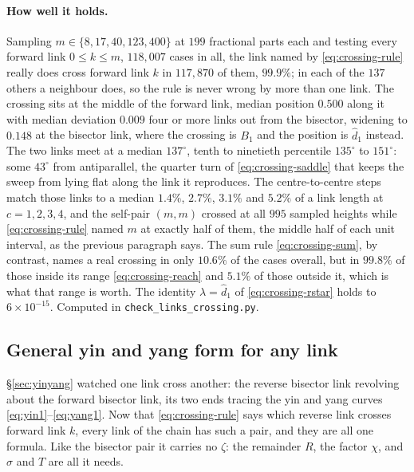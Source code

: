 \documentclass[11pt]{article}
\theoremstyle{definition}
\begin{document}
\paragraph{How well it holds.} Sampling $m\in\{8,17,40,123,400\}$ at $199$
fractional parts each and testing every forward link $0\leq k\leq m$,
$118{,}007$ cases in all, the link named by \eqref{eq:crossing-rule} really does
cross forward link $k$ in $117{,}870$ of them, $99.9\%$; in each of the $137$
others a neighbour does, so the rule is never wrong by more than one link. The
crossing sits at the middle of the forward link, median position $0.500$ along
it with median deviation $0.009$ four or more links out from the bisector, widening
to $0.148$ at the bisector link, where the crossing is $B_1$ and the position is
$\hat d_1$ instead. The two links meet at a median $137^{\circ}$, tenth to
ninetieth percentile $135^{\circ}$ to $151^{\circ}$: some $43^{\circ}$ from
antiparallel, the quarter turn of \eqref{eq:crossing-saddle} that keeps the
sweep from lying flat along the link it reproduces. The centre-to-centre steps
match those links to a median $1.4\%$, $2.7\%$, $3.1\%$ and $5.2\%$ of a link
length at $c=1,2,3,4$, and the self-pair $(m,m)$ crossed at all $995$ sampled
heights while \eqref{eq:crossing-rule} named $m$ at exactly half of them, the
middle half of each unit interval, as the previous paragraph says. The sum rule
\eqref{eq:crossing-sum}, by contrast, names a real crossing in only $10.6\%$ of
the cases overall, but in $99.8\%$ of those inside its range
\eqref{eq:crossing-reach} and $5.1\%$ of those outside it, which is what that
range is worth. The identity $\lambda=\hat d_1$ of \eqref{eq:crossing-rstar}
holds to $6\times10^{-15}$. Computed in \texttt{check\_links\_crossing.py}.

\subsection{General yin and yang form for any link}\label{sec:yinyang-any}

\S\ref{sec:yinyang} watched one link cross another: the reverse bisector link
revolving about the forward bisector link, its two ends tracing the yin and
yang curves \eqref{eq:yin1}--\eqref{eq:yang1}. Now that \eqref{eq:crossing-rule}
says which reverse link crosses forward link $k$, every link of the chain has
such a pair, and they are all one formula. Like the bisector pair it carries no
$\zeta$: the remainder $R$, the factor $\chi$, and $\sigma$ and $T$ are all it
needs.
\end{document}
